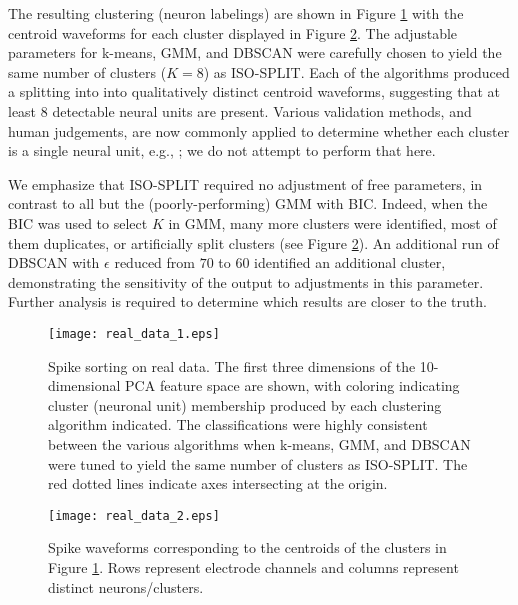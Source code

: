 \documentclass[10pt]{article}
\begin{document}
The resulting clustering (neuron labelings) are shown in Figure \ref{fig:real_data_1} with the centroid waveforms for each cluster displayed in Figure \ref{fig:real_data_2}. The adjustable parameters for k-means, GMM, and DBSCAN were carefully chosen to yield the same number of clusters ($K=8$) as ISO-SPLIT. Each of the algorithms produced a splitting into into qualitatively distinct centroid waveforms, suggesting that at least 8 detectable neural units are present. Various validation methods, and human judgements, are now commonly applied to determine whether each cluster is a single neural unit, e.g., \cite{Hill2011}; we do not attempt to perform that here.

We emphasize that ISO-SPLIT required no adjustment of free parameters, in contrast to all but the (poorly-performing) GMM with BIC. Indeed, when the BIC was used to select $K$ in GMM, many more clusters were identified, most of them duplicates, or artificially split clusters (see Figure \ref{fig:real_data_2}). An additional run of DBSCAN with $\epsilon$ reduced from $70$ to $60$ identified an additional cluster, demonstrating the sensitivity of the output to adjustments in this parameter. Further analysis is required to determine which results are closer to the truth.

\begin{figure}
\begin{center}
\texttt{[image: real\_data\_1.eps]}
\end{center}
\caption{
  Spike sorting on real data. The first three dimensions of the 10-dimensional PCA feature space are shown, with coloring indicating cluster (neuronal unit) membership produced by each clustering algorithm indicated. The classifications were highly consistent between the various algorithms when k-means, GMM, and DBSCAN were tuned to yield the same number of clusters as ISO-SPLIT.
  The red dotted lines indicate axes intersecting at the origin.
}
\label{fig:real_data_1}
\end{figure}

\begin{figure}
\begin{center}
\texttt{[image: real\_data\_2.eps]}
\end{center}
\caption{
Spike waveforms corresponding to the centroids of the clusters in Figure \ref{fig:real_data_1}. Rows represent electrode channels and columns represent distinct neurons/clusters.
}
\label{fig:real_data_2}
\end{figure}
\end{document}
